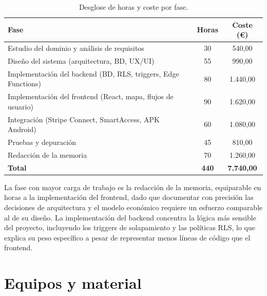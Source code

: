 \begin{table}[!ht]
    \centering
    \caption{Desglose de horas y coste por fase.}
    \label{tbl:horas_trabajo}
    \begin{tabularx}{0.92\textwidth}{Xcc}
        \toprule
        \textbf{Fase}                                                  & \textbf{Horas} & \textbf{Coste (€)} \\
        \midrule
        Estudio del dominio y análisis de requisitos                   & 30             & 540,00             \\
        Diseño del sistema (arquitectura, BD, UX/UI)                   & 55             & 990,00             \\
        Implementación del backend (BD, RLS, triggers, Edge Functions) & 80             & 1.440,00           \\
        Implementación del frontend (React, mapa, flujos de usuario)   & 90             & 1.620,00           \\
        Integración (Stripe Connect, SmartAccess, APK Android)         & 60             & 1.080,00           \\
        Pruebas y depuración                                           & 45             & 810,00             \\
        Redacción de la memoria                                        & 70             & 1.260,00           \\
        \midrule
        \textbf{Total}                                                 & \textbf{440}   & \textbf{7.740,00}  \\
        \bottomrule
    \end{tabularx}
\end{table}

La fase con mayor carga de trabajo es la redacción de la memoria, equiparable en horas a la implementación del frontend, dado que documentar con precisión las decisiones de arquitectura y el modelo económico requiere un esfuerzo comparable al de su diseño. La implementación del backend concentra la lógica más sensible del proyecto, incluyendo los triggers de solapamiento y las políticas RLS, lo que explica su peso específico a pesar de representar menos líneas de código que el frontend.

\section{Equipos y material}
\label{sec:presupuesto_hardware}

